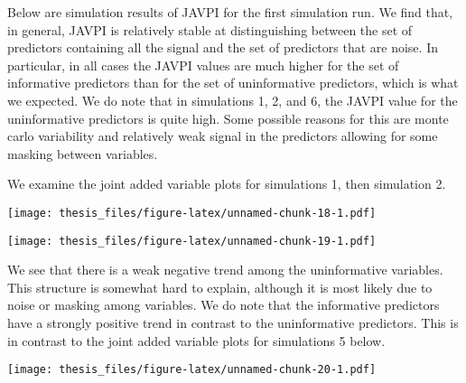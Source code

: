 \documentclass[12pt,twoside]{reedthesis}
\theoremstyle{definition}
\theoremstyle{definition}
\theoremstyle{definition}
\theoremstyle{remark}
\begin{document}
Below are simulation results of JAVPI for the first simulation run. We
find that, in general, JAVPI is relatively stable at distinguishing
between the set of predictors containing all the signal and the set of
predictors that are noise. In particular, in all cases the JAVPI values
are much higher for the set of informative predictors than for the set
of uninformative predictors, which is what we expected. We do note that
in simulations 1, 2, and 6, the JAVPI value for the uninformative
predictors is quite high. Some possible reasons for this are monte carlo
variability and relatively weak signal in the predictors allowing for
some masking between variables. \par 
\begin{table}

\caption{\label{tab:unnamed-chunk-17}JAVPI values from first simulation run}
\centering
{}
\end{table}
We examine the joint added variable plots for simulations 1, then
simulation 2. \par 

\texttt{[image: thesis\_files/figure-latex/unnamed-chunk-18-1.pdf]}

\texttt{[image: thesis\_files/figure-latex/unnamed-chunk-19-1.pdf]}

We see that there is a weak negative trend among the uninformative
variables. This structure is somewhat hard to explain, although it is
most likely due to noise or masking among variables. We do note that the
informative predictors have a strongly positive trend in contrast to the
uninformative predictors. This is in contrast to the joint added
variable plots for simulations 5 below. \par 

\texttt{[image: thesis\_files/figure-latex/unnamed-chunk-20-1.pdf]}
\end{document}

